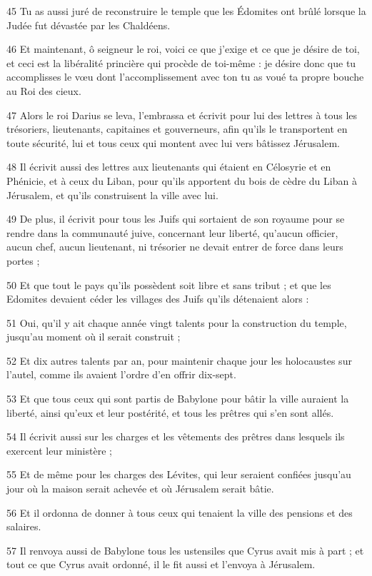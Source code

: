 \par 45 Tu as aussi juré de reconstruire le temple que les Édomites ont brûlé lorsque la Judée fut dévastée par les Chaldéens.
\par 46 Et maintenant, ô seigneur le roi, voici ce que j'exige et ce que je désire de toi, et ceci est la libéralité princière qui procède de toi-même : je désire donc que tu accomplisses le vœu dont l'accomplissement avec ton tu as voué ta propre bouche au Roi des cieux.
\par 47 Alors le roi Darius se leva, l'embrassa et écrivit pour lui des lettres à tous les trésoriers, lieutenants, capitaines et gouverneurs, afin qu'ils le transportent en toute sécurité, lui et tous ceux qui montent avec lui vers bâtissez Jérusalem.
\par 48 Il écrivit aussi des lettres aux lieutenants qui étaient en Célosyrie et en Phénicie, et à ceux du Liban, pour qu'ils apportent du bois de cèdre du Liban à Jérusalem, et qu'ils construisent la ville avec lui.
\par 49 De plus, il écrivit pour tous les Juifs qui sortaient de son royaume pour se rendre dans la communauté juive, concernant leur liberté, qu'aucun officier, aucun chef, aucun lieutenant, ni trésorier ne devait entrer de force dans leurs portes ;
\par 50 Et que tout le pays qu'ils possèdent soit libre et sans tribut ; et que les Edomites devaient céder les villages des Juifs qu'ils détenaient alors :
\par 51 Oui, qu'il y ait chaque année vingt talents pour la construction du temple, jusqu'au moment où il serait construit ;
\par 52 Et dix autres talents par an, pour maintenir chaque jour les holocaustes sur l'autel, comme ils avaient l'ordre d'en offrir dix-sept.
\par 53 Et que tous ceux qui sont partis de Babylone pour bâtir la ville auraient la liberté, ainsi qu'eux et leur postérité, et tous les prêtres qui s'en sont allés.
\par 54 Il écrivit aussi sur les charges et les vêtements des prêtres dans lesquels ils exercent leur ministère ;
\par 55 Et de même pour les charges des Lévites, qui leur seraient confiées jusqu'au jour où la maison serait achevée et où Jérusalem serait bâtie.
\par 56 Et il ordonna de donner à tous ceux qui tenaient la ville des pensions et des salaires.
\par 57 Il renvoya aussi de Babylone tous les ustensiles que Cyrus avait mis à part ; et tout ce que Cyrus avait ordonné, il le fit aussi et l'envoya à Jérusalem.
